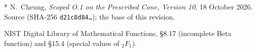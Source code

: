 * N.~Cheung,
\emph{Scoped O.1 on the Prescribed Cone, Version 10},
18 October 2026. Source 
(SHA-256 \texttt{d21c8d84\ldots}); the base of this revision.

\dag{} NIST Digital Library of Mathematical Functions, \S8.17
(incomplete Beta function) and \S15.4 (special values of \({}_2F_1\)).
